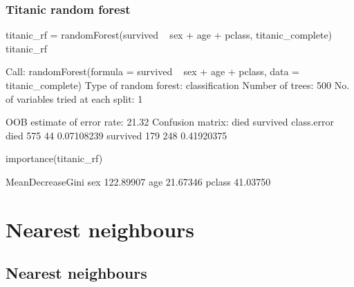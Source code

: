 \documentclass[a4paper]{article}\usepackage[]{graphicx}\usepackage[]{xcolor}
\begin{document}
\subsubsection{Titanic random forest}
\begin{Schunk}
\begin{Sinput}
titanic_rf = randomForest(survived ~ sex + age + pclass, titanic_complete)
titanic_rf
\end{Sinput}
\begin{Soutput}

Call:
 randomForest(formula = survived ~ sex + age + pclass, data = titanic_complete) 
               Type of random forest: classification
                     Number of trees: 500
No. of variables tried at each split: 1

        OOB estimate of  error rate: 21.32%
Confusion matrix:
         died survived class.error
died      575       44  0.07108239
survived  179      248  0.41920375
\end{Soutput}
\begin{Sinput}
importance(titanic_rf)
\end{Sinput}
\begin{Soutput}
       MeanDecreaseGini
sex           122.89907
age            21.67346
pclass         41.03750
\end{Soutput}
\end{Schunk}
\newpage

\section{Nearest neighbours}\label{sec:33}
\subsection{Nearest neighbours}
\end{document}

